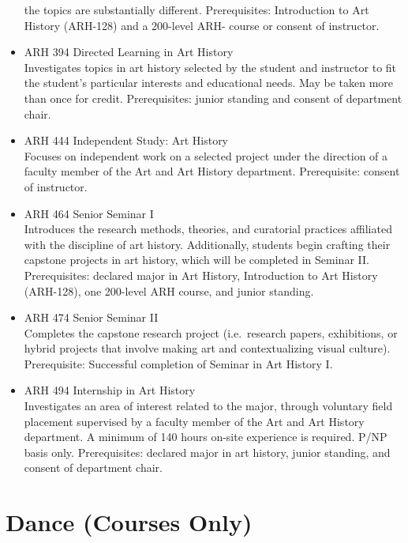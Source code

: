 \documentclass[
  letterpaper,
]{scrbook}
\begin{document}
\begin{itemize}
  the topics are substantially different. Prerequisites: Introduction to
  Art History (ARH-128) and a 200-level ARH- course or consent of
  instructor.\\
\item
  ARH 394 Directed Learning in Art History\\
  Investigates topics in art history selected by the student and
  instructor to fit the student's particular interests and educational
  needs. May be taken more than once for credit. Prerequisites: junior
  standing and consent of department chair.\\
\item
  ARH 444 Independent Study: Art History\\
  Focuses on independent work on a selected project under the direction
  of a faculty member of the Art and Art History department.
  Prerequisite: consent of instructor.\\
\item
  ARH 464 Senior Seminar I\\
  Introduces the research methods, theories, and curatorial practices
  affiliated with the discipline of art history. Additionally, students
  begin crafting their capstone projects in art history, which will be
  completed in Seminar II. Prerequisites: declared major in Art History,
  Introduction to Art History (ARH-128), one 200-level ARH course, and
  junior standing.\\
\item
  ARH 474 Senior Seminar II\\
  Completes the capstone research project (i.e.~research papers,
  exhibitions, or hybrid projects that involve making art and
  contextualizing visual culture). Prerequisite: Successful completion
  of Seminar in Art History I.\\
\item
  ARH 494 Internship in Art History\\
  Investigates an area of interest related to the major, through
  voluntary field placement supervised by a faculty member of the Art
  and Art History department. A minimum of 140 hours on-site experience
  is required. P/NP basis only. Prerequisites: declared major in art
  history, junior standing, and consent of department chair.
\end{itemize}

\section{Dance (Courses Only)}\label{sec-dance}
\end{document}
